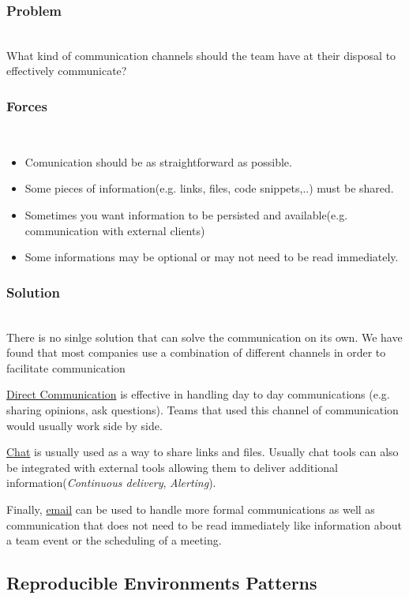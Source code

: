 \documentclass{llncs}
\begin{document}
		\subsubsection{Problem}~\\

		What kind of communication channels should the team have at their disposal to effectively communicate?

		\subsubsection{Forces}~\\
		\begin{itemize}
			\item Comunication should be as straightforward as possible.
			\item Some pieces of information(e.g. links, files, code snippets,..) must be shared.
			\item Sometimes you want information to be persisted and available(e.g. communication with external clients)
			\item Some informations may be optional or may not need to be read immediately.
		\end{itemize}

		\subsubsection{Solution}~\\

		There is no sinlge solution that can solve the communication on its own. We have found that most companies use a combination of different channels in order to facilitate communication

		\underline{Direct Communication} is effective in handling day to day communications (e.g. sharing opinions, ask questions). Teams that used this channel of communication would usually work side by side.

		\underline{Chat} is usually used as a way to share links and files. Usually chat tools can also be integrated with external tools allowing them to deliver additional information(\textit{Continuous delivery}, \textit{Alerting}).

		Finally, \underline{email} can be used to handle more formal communications as well as communication that does not need to be read immediately like information about a team event or the scheduling of a meeting.

	\subsection{Reproducible Environments Patterns}
\end{document}
